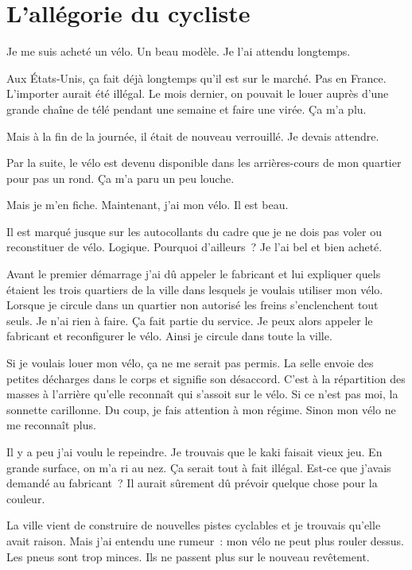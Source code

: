 \chapter{L'allégorie du cycliste}\label{cycliste}

Je me suis acheté un vélo. Un beau modèle. Je l’ai attendu longtemps.

Aux États-Unis, ça fait déjà longtemps qu’il est sur le marché. Pas en France. L’importer aurait été illégal. Le mois dernier, on pouvait le louer auprès d’une grande chaîne de télé pendant une
semaine et faire une virée. Ça m’a plu.

Mais à la fin de la journée, il était de nouveau verrouillé. Je devais attendre.

Par la suite, le vélo est devenu disponible dans les arrières-cours de mon quartier pour pas un rond. Ça m’a paru un peu louche.

Mais je m’en fiche. Maintenant, j’ai mon vélo. Il est beau.

Il est marqué jusque sur les autocollants du cadre que je ne dois pas voler ou reconstituer de vélo. Logique. Pourquoi d’ailleurs~? Je l’ai bel et bien acheté.

Avant le premier démarrage j’ai dû appeler le fabricant et lui expliquer quels étaient les trois quartiers de la ville dans lesquels je voulais utiliser mon vélo. Lorsque je circule dans un quartier
non autorisé les freins s’enclenchent tout seuls. Je n’ai rien à faire. Ça fait partie du service. Je peux alors appeler le fabricant et reconfigurer le vélo. Ainsi je circule dans toute la
ville.

Si je voulais louer mon vélo, ça ne me serait pas permis. La selle envoie des petites décharges dans le corps et signifie son désaccord. C’est à la répartition des masses à l’arrière qu’elle reconnaît
qui s’assoit sur le vélo. Si ce n’est pas moi, la sonnette carillonne. Du coup, je fais attention à mon régime. Sinon mon vélo ne me reconnaît plus.

Il y a peu j’ai voulu le repeindre. Je trouvais que le kaki faisait vieux jeu. En grande surface, on m’a ri au nez. Ça serait tout à fait illégal. Est-ce que j’avais demandé au fabricant~? Il aurait
sûrement dû prévoir quelque chose pour la couleur.

La ville vient de construire de nouvelles pistes cyclables et je trouvais qu’elle avait raison. Mais j’ai entendu une rumeur~: mon vélo ne peut plus rouler dessus. Les pneus sont trop minces. Ils ne
passent plus sur le nouveau revêtement.

